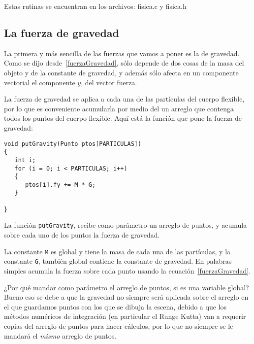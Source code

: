 Estas rutinas se encuentran en los archivos: fisica.c y fisica.h
\subsection{La fuerza de gravedad}
La primera y más sencilla de las fuerzas que vamos a poner es la de gravedad.
Como se dijo desde~\ref{fuerzaGravedad}, sólo depende de dos cosas de la masa del objeto y de la constante de gravedad, y además sólo afecta en un componente vectorial el componente $y$, del vector fuerza.

La fuerza de gravedad se aplica a cada una de las partículas del cuerpo flexible, por lo que es conveniente acumularla por medio del un arreglo que contenga todos los puntos del cuerpo flexible.
Aquí está la función que pone la fuerza de gravedad:
\begin{verbatim}
void putGravity(Punto ptos[PARTICULAS])
{
   int i;
   for (i = 0; i < PARTICULAS; i++)
   {
      ptos[i].fy += M * G;
   }

}
\end{verbatim} 
La función \verb|putGravity|, recibe como parámetro un arreglo de puntos, y acumula sobre cada uno de los puntos la fuerza de gravedad.

La constante \verb|M| es global y tiene la masa de cada una de las partículas, y la constante \verb|G|, también global contiene la constante de gravedad.
En palabras simples acumula la fuerza sobre cada punto usando la ecuación~\ref{fuerzaGravedad}.

¿Por qué mandar como parámetro el arreglo de puntos, si es una variable global? Bueno eso se debe a que la gravedad no siempre será aplicada sobre el arreglo en el que guardamos puntos con los que se dibuja la escena, debido a que los métodos numéricos de integración (en particular el Runge Kutta) van a requerir copias del arreglo de puntos para hacer cálculos, por lo que no siempre se le mandará el \emph{mismo} arreglo de puntos.

